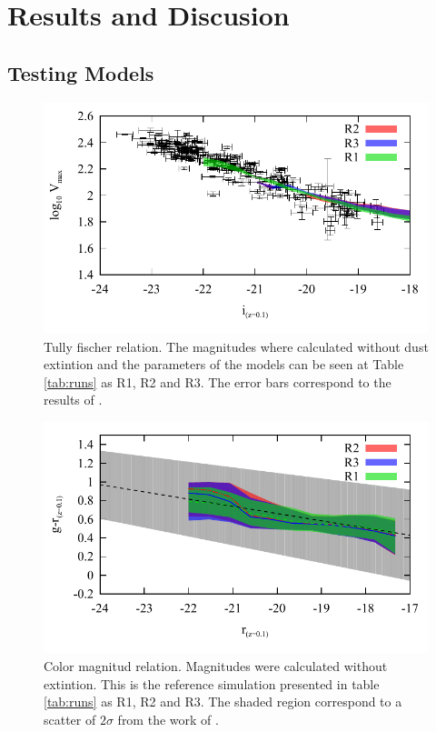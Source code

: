 \documentclass[usenatbib]{mn2e}
\begin{document}
\section{Results and Discusion}
\label{sec:results}


\subsection{Testing Models}
\label{sec:calibration}

\begin{figure}
\centering
 \includegraphics[scale=0.68]{figures/tests/T_F-disk-velmax.pdf}
\caption{ Tully fischer relation. The magnitudes where calculated
  without dust extintion and the parameters of the models can be seen
  at Table \ref{tab:runs}  as R1, R2 and R3. The error bars correspond
  to the results of \citet{2007AJ....134..945P}.\label{fig:T-F-diagram}} 
\end{figure}
\begin{figure}
\centering
 \includegraphics[scale=0.68]{figures/tests/Color_Mag.pdf}
\caption{ Color magnitud relation. Magnitudes were calculated without
  extintion. This is the reference simulation presented in table
  \ref{tab:runs}  as R1, R2 and R3. The shaded region correspond to a
  scatter of  $2\sigma$ from the work  of
  \citet{2012MNRAS.423.1583M}.\label{fig:CM-diagram}} 
\end{figure}
\end{document}
